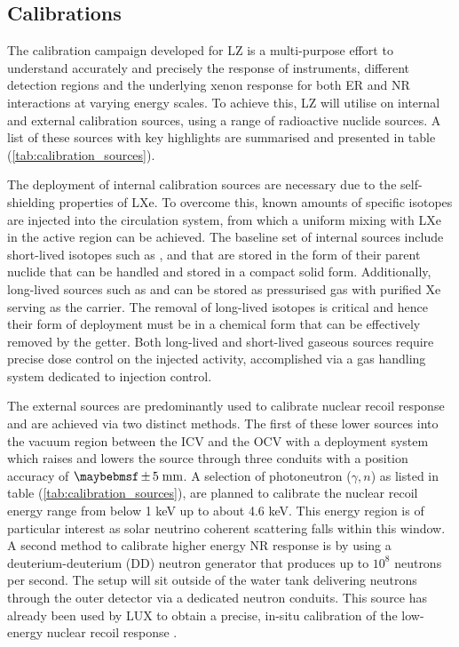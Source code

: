\subsection{Calibrations}
\label{subsec:calibrations}

The calibration campaign developed for LZ is a multi-purpose effort to understand accurately and precisely the response of instruments, different detection regions and the underlying xenon response for both ER and NR interactions at varying energy scales. To achieve this, LZ will utilise on internal and external calibration sources, using a range of radioactive nuclide sources. A list of these sources with key highlights are summarised and presented in table (\ref{tab:calibration_sources}).

The deployment of internal calibration sources are necessary due to the self-shielding properties of LXe. To overcome this, known amounts of specific isotopes are injected into the circulation system, from which a uniform mixing with LXe in the active region can be achieved. The baseline set of internal sources include short-lived isotopes such as \KrETm{}, \XeOTOm{} and \RnTTZ{} that are stored in the form of their parent nuclide that can be handled and stored in a compact solid form. Additionally, long-lived sources such as \HT{} and \COF{} can be stored as pressurised gas with purified Xe serving as the carrier. The removal of long-lived isotopes is critical and hence their form of deployment must be in a chemical form that can be effectively removed by the getter. Both long-lived and short-lived gaseous sources require precise dose control on the injected activity, accomplished via a gas handling system dedicated to injection control.

The external sources are predominantly used to calibrate nuclear recoil response and are achieved via two distinct methods. The first of these lower sources into the vacuum region between the ICV and the OCV with a deployment system which raises and lowers the source through three conduits with a position accuracy of $\pm5 \; \MathText{mm}$. A selection of photoneutron ($\gamma, n$) as listed in table (\ref{tab:calibration_sources}), are planned to calibrate the nuclear recoil energy range from below 1 keV up to about 4.6 keV. This energy region is of particular interest as \BE{} solar neutrino coherent scattering falls within this window. A second method to calibrate higher energy NR response is by using a deuterium-deuterium (DD) neutron generator that produces up to $10^{8}$ neutrons per second. The setup will sit outside of the water tank delivering neutrons through the outer detector via a dedicated neutron conduits. This source has already been used by LUX to obtain a precise, in-situ calibration of the low-energy nuclear recoil response \cite{lux_dd}.

